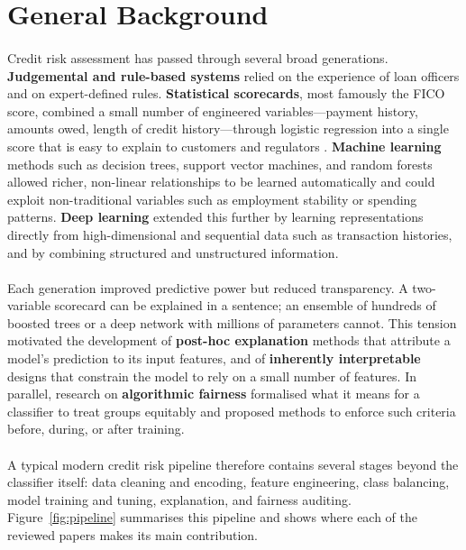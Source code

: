 \documentclass[12pt,a4paper,final]{extreport}
\begin{document}
\section{General Background}

\paragraph{} Credit risk assessment has passed through several broad generations. \textbf{Judgemental and rule-based systems} relied on the experience of loan officers and on expert-defined rules. \textbf{Statistical scorecards}, most famously the FICO score, combined a small number of engineered variables---payment history, amounts owed, length of credit history---through logistic regression into a single score that is easy to explain to customers and regulators \cite{p1}. \textbf{Machine learning} methods such as decision trees, support vector machines, and random forests allowed richer, non-linear relationships to be learned automatically and could exploit non-traditional variables such as employment stability or spending patterns. \textbf{Deep learning} extended this further by learning representations directly from high-dimensional and sequential data such as transaction histories, and by combining structured and unstructured information.

\paragraph{} Each generation improved predictive power but reduced transparency. A two-variable scorecard can be explained in a sentence; an ensemble of hundreds of boosted trees or a deep network with millions of parameters cannot. This tension motivated the development of \textbf{post-hoc explanation} methods that attribute a model's prediction to its input features, and of \textbf{inherently interpretable} designs that constrain the model to rely on a small number of features. In parallel, research on \textbf{algorithmic fairness} formalised what it means for a classifier to treat groups equitably and proposed methods to enforce such criteria before, during, or after training.

\paragraph{} A typical modern credit risk pipeline therefore contains several stages beyond the classifier itself: data cleaning and encoding, feature engineering, class balancing, model training and tuning, explanation, and fairness auditing. Figure~\ref{fig:pipeline} summarises this pipeline and shows where each of the reviewed papers makes its main contribution.
\end{document}
